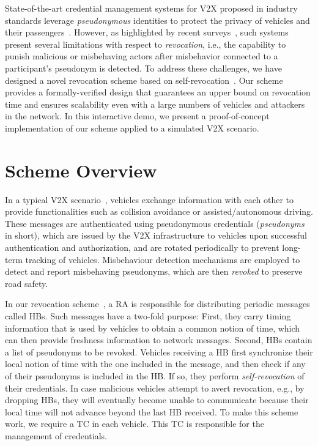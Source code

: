 \documentclass[conference]{IEEEtran}
\begin{document}
State-of-the-art credential management systems for \ac{V2X} proposed in industry
standards leverage \emph{pseudonymous} identities to protect the privacy of
vehicles and their passengers~\cite{brecht2018scms,etsi2022102941}. However, as
highlighted by recent
surveys~\cite{wang2020certificate,yoshizawa2022v2x_survey}, such systems present
several limitations with respect to \emph{revocation}, i.e., the capability to
punish malicious or misbehaving actors after misbehavior connected to a
participant's pseudonym is detected. To address these challenges, we have
designed a novel revocation scheme based on
self-revocation~\cite{scopelliti2024efficient}. Our scheme provides a
formally-verified design that guarantees an upper bound on revocation time and
ensures scalability even with a large numbers of vehicles and attackers in the
network. In this interactive demo, we present a proof-of-concept implementation
of our scheme applied to a simulated \ac{V2X} scenario.

\section{Scheme Overview}

In a typical \ac{V2X} scenario~\cite{brecht2018scms,etsi2022102941}, vehicles
exchange information with each other to provide functionalities such as
collision avoidance or assisted/autonomous driving. These messages are
authenticated using pseudonymous credentials (\emph{pseudonyms} in short), which
are issued by the \ac{V2X} infrastructure to vehicles upon successful
authentication and authorization, and are rotated periodically to prevent
long-term tracking of vehicles. Misbehaviour detection mechanisms are employed
to detect and report misbehaving pseudonyms, which are then \emph{revoked} to
preserve road safety.

In our revocation scheme~\cite{scopelliti2024efficient}, a \ac{RA} is
responsible for distributing periodic messages called \acp{HB}. Such messages
have a two-fold purpose: First, they carry timing information that is used by
vehicles to obtain a common notion of time, which can then provide freshness
information to network messages. Second, \acp{HB} contain a list of pseudonyms
to be revoked. Vehicles receiving a \ac{HB} first synchronize their local notion
of time with the one included in the message, and then check if any of their
pseudonyms is included in the \ac{HB}. If so, they perform
\emph{self-revocation} of their credentials. In case malicious vehicles attempt
to avert revocation, e.g., by dropping \acp{HB}, they will eventually become unable to
communicate because their local time will not advance beyond the
last \ac{HB} received. To make this scheme work, we require a \ac{TC} in each
vehicle. This \ac{TC} is responsible for the management of credentials.
\end{document}
